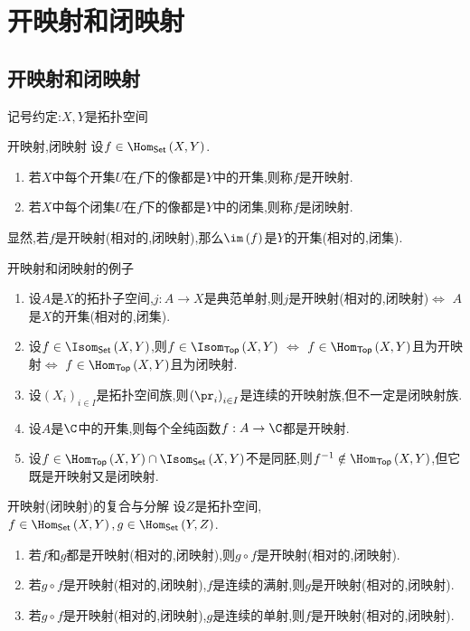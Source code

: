 \chapter{开映射和闭映射}

\section{开映射和闭映射}

记号约定:$X,Y$是拓扑空间

\begin{definition}{开映射,闭映射}{}
	设$f\in\Hom_{\mathsf{Set}}\left(X,Y\right)$.
	\begin{enumerate}
		\item 若$X$中每个开集$U$在$f$下的像都是$Y$中的开集,则称$f$是开映射.
		\item 若$X$中每个闭集$U$在$f$下的像都是$Y$中的闭集,则称$f$是闭映射.
	\end{enumerate}
\end{definition}

\begin{remark}{}{}
	显然,若$f$是开映射(相对的,闭映射),那么$\im\left(f\right)$是$Y$的开集(相对的,闭集).
\end{remark}

\begin{example}{开映射和闭映射的例子}{}
	\begin{enumerate}
		\item 设$A$是$X$的拓扑子空间,$j:A\to X$是典范单射,则$j$是开映射(相对的,闭映射)$\iff$ $A$是$X$的开集(相对的,闭集).
		\item 设$f\in\Isom_{\mathsf{Set}}\left(X,Y\right)$,则$f\in\Isom_{\mathsf{Top}}\left(X,Y\right)$ $\iff$ $f\in\Hom_{\mathsf{Top}}\left(X,Y\right)$且为开映射$\iff$ $f\in\Hom_{\mathsf{Top}}\left(X,Y\right)$且为闭映射.
		\item 设$\left(X_{i}\right)_{i\in I}$是拓扑空间族,则$\left(\pr_{i}\right)_{i\in I}$是连续的开映射族,但不一定是闭映射族.
		\item 设$A$是$\C$中的开集,则每个全纯函数$f:A\to\C$都是开映射.
		\item 设$f\in\Hom_{\mathsf{Top}}\left(X,Y\right)\cap\Isom_{\mathsf{Set}}\left(X,Y\right)$不是同胚,则$f^{-1}\notin\Hom_{\mathsf{Top}}\left(X,Y\right)$,但它既是开映射又是闭映射.
	\end{enumerate}
\end{example}

\begin{proposition}{开映射(闭映射)的复合与分解}{}
	设$Z$是拓扑空间,$f\in\Hom_{\mathsf{Set}}\left(X,Y\right),g\in\Hom_{\mathsf{Set}}\left(Y,Z\right)$.
	\begin{enumerate}
		\item 若$f$和$g$都是开映射(相对的,闭映射),则$g\circ f$是开映射(相对的,闭映射).
		\item 若$g\circ f$是开映射(相对的,闭映射),$f$是连续的满射,则$g$是开映射(相对的,闭映射).
		\item 若$g\circ f$是开映射(相对的,闭映射),$g$是连续的单射,则$f$是开映射(相对的,闭映射).
	\end{enumerate}
\end{proposition}

